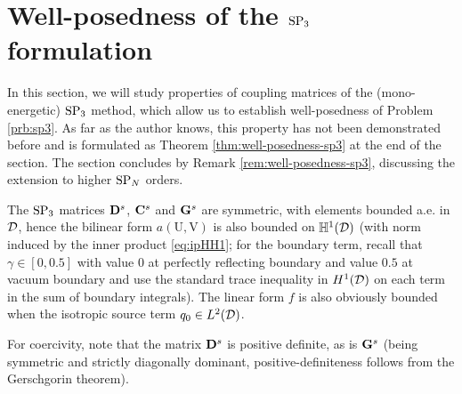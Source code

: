 

\section{Well-posedness of the $\SPN[3]$ formulation}

In this section, we will study 
properties of coupling matrices of the (mono-energetic) $\SPN[3]$ method, which allow us to establish well-posedness
of Problem \ref{prb:sp3}. As far as the author knows, this property has not been demonstrated before and is
formulated as Theorem \ref{thm:well-posedness-sp3} at the end of the section. The section concludes by Remark
\ref{rem:well-posedness-sp3}, discussing the extension to higher $\SPN$ orders.

The $\SPN[3]$ matrices $\mat{D}^s$, $\mat{C}^s$ and $\mat{G}^s$ are symmetric, with elements bounded
a.e. in $\VV$, hence the bilinear form $a(\mathrm{U}, \mathrm{V})$ is also bounded on $\mathbb{H}^1(\VV)$ (with norm
induced by the inner product \eqref{eq:ipHH1}; for the boundary term,  recall that $\gamma \in [0,0.5]$ with value $0$ at perfectly 
reflecting boundary and value $0.5$ at vacuum boundary and use the standard trace inequality in
$H^1(\VV)$ on each term in the sum of boundary integrals). The linear form $f$ is also obviously bounded when the
isotropic source term $q_0 \in \Lp[2](\VV)$.

For coercivity, note that the matrix $\mat{D}^s$ is positive definite, as is $\mat{G}^s$ (being symmetric and strictly
diagonally dominant, positive-definiteness follows from the Gerschgorin theorem). 

